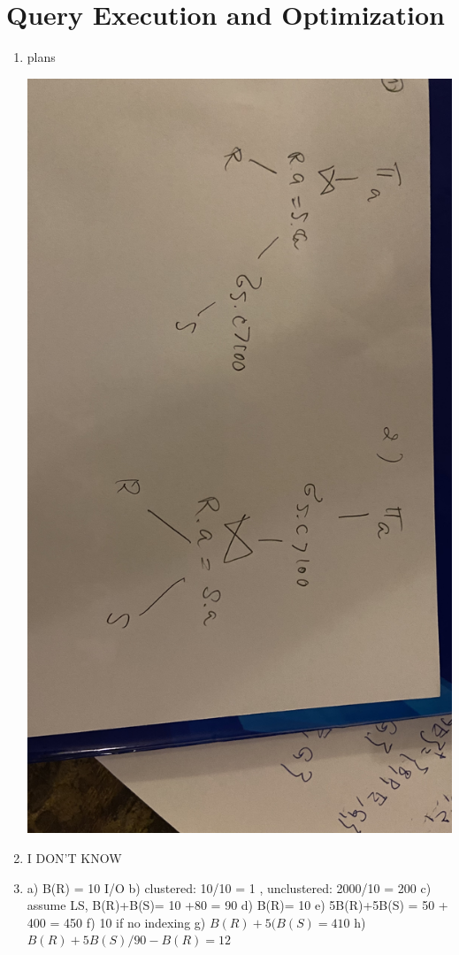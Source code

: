 \documentclass[a4paper, 11pt]{article}
\begin{document}
\section{Query Execution and Optimization}
\begin{enumerate}
\item plans

\includegraphics[width=\textwidth]{plans.jpg}

\item  I DON'T KNOW
\item
 a) B(R) = 10 I/O
b)  clustered: 10/10 = 1 ,  unclustered: 2000/10 = 200
c) assume LS,  B(R)+B(S)= 10 +80 = 90
d) B(R)= 10
e) 5B(R)+5B(S) = 50 + 400 = 450
f) 10 if no indexing 
g) $B(R) + 5(B(S) = 410$
h)$ B(R) + 5B(S)/90-B(R) =12$

\end{enumerate}
\end{document}
